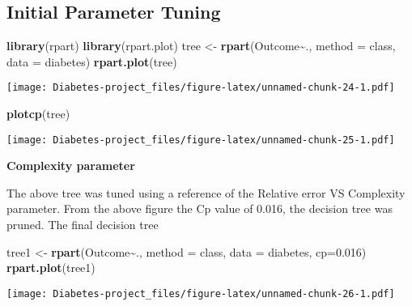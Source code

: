 \documentclass[
]{article}
\newenvironment{Shaded}{\begin{snugshade}}{\end{snugshade}}
\newcommand{\AttributeTok}[1]{\textcolor[rgb]{0.13,0.29,0.53}{#1}}
\newcommand{\FloatTok}[1]{\textcolor[rgb]{0.00,0.00,0.81}{#1}}
\newcommand{\FunctionTok}[1]{\textcolor[rgb]{0.13,0.29,0.53}{\textbf{#1}}}
\newcommand{\NormalTok}[1]{#1}
\newcommand{\OtherTok}[1]{\textcolor[rgb]{0.56,0.35,0.01}{#1}}
\newcommand{\SpecialCharTok}[1]{\textcolor[rgb]{0.81,0.36,0.00}{\textbf{#1}}}
\newcommand{\StringTok}[1]{\textcolor[rgb]{0.31,0.60,0.02}{#1}}
\begin{document}
\hypertarget{initial-parameter-tuning}{%
\subsection{\texorpdfstring{\textbf{Initial Parameter
Tuning}}{Initial Parameter Tuning}}\label{initial-parameter-tuning}}

\begin{Shaded}
\begin{Highlighting}[]
\FunctionTok{library}\NormalTok{(rpart)}
\FunctionTok{library}\NormalTok{(rpart.plot)}
\NormalTok{tree }\OtherTok{\textless{}{-}} \FunctionTok{rpart}\NormalTok{(Outcome}\SpecialCharTok{\textasciitilde{}}\NormalTok{., }\AttributeTok{method =} \StringTok{\textquotesingle{}class\textquotesingle{}}\NormalTok{, }\AttributeTok{data =}\NormalTok{ diabetes)}
\FunctionTok{rpart.plot}\NormalTok{(tree)}
\end{Highlighting}
\end{Shaded}

\texttt{[image: Diabetes-project\_files/figure-latex/unnamed-chunk-24-1.pdf]}

\begin{Shaded}
\begin{Highlighting}[]
\FunctionTok{plotcp}\NormalTok{(tree)}
\end{Highlighting}
\end{Shaded}

\texttt{[image: Diabetes-project\_files/figure-latex/unnamed-chunk-25-1.pdf]}

\textbf{Complexity parameter}

The above tree was tuned using a reference of the Relative error VS
Complexity parameter. From the above figure the Cp value of 0.016, the
decision tree was pruned. The final decision tree

\begin{Shaded}
\begin{Highlighting}[]
\NormalTok{tree1 }\OtherTok{\textless{}{-}} \FunctionTok{rpart}\NormalTok{(Outcome}\SpecialCharTok{\textasciitilde{}}\NormalTok{., }\AttributeTok{method =} \StringTok{\textquotesingle{}class\textquotesingle{}}\NormalTok{, }\AttributeTok{data =}\NormalTok{ diabetes, }\AttributeTok{cp=}\FloatTok{0.016}\NormalTok{)}
\FunctionTok{rpart.plot}\NormalTok{(tree1)}
\end{Highlighting}
\end{Shaded}

\texttt{[image: Diabetes-project\_files/figure-latex/unnamed-chunk-26-1.pdf]}
\end{document}
